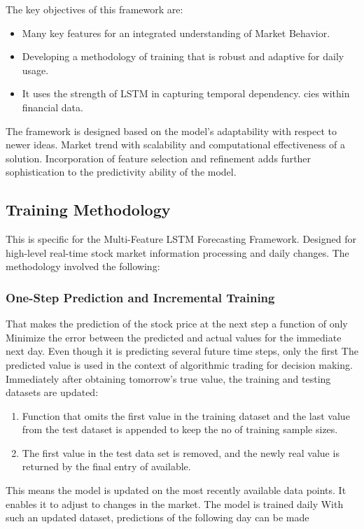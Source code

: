 The key objectives of this framework are:
\begin{itemize}
    \item Many key features for an integrated understanding of
Market Behavior.
    \item Developing a methodology of training that is robust and adaptive for daily usage.
    \item It uses the strength of LSTM in capturing temporal dependency.
cies within financial data.
\end{itemize}

The framework is designed based on the model's adaptability with respect to newer ideas. Market trend with scalability and computational effectiveness of a solution.
Incorporation of feature selection and refinement adds further sophistication to the predictivity ability of the model.

\subsection{Training Methodology}
This is specific for the Multi-Feature LSTM Forecasting Framework. Designed for high-level real-time stock market information processing and daily changes. The methodology involved the following:
\subsubsection{One-Step Prediction and Incremental Training}
That makes the prediction of the stock price at the next step a function of only
Minimize the error between the predicted and actual values for the immediate next day. Even though it is predicting several future time steps, only the first
The predicted value is used in the context of algorithmic trading for decision making.
Immediately after obtaining tomorrow's true value, the training and testing datasets
are updated:
\begin{enumerate}
    \item Function that omits the first value in the training dataset and the last value from the test dataset is appended to keep the no of training sample sizes.
    \item The first value in the test data set is removed, and the newly
real value is returned by the final entry of available.
\end{enumerate}

This means the model is updated on the most recently available data points.
It enables it to adjust to changes in the market. The model is trained daily
With such an updated dataset, predictions of the following day can be made

